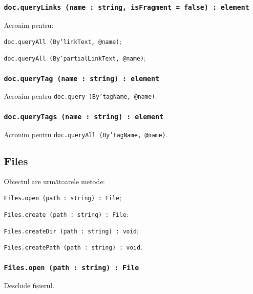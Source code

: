 \subsubsection{\texttt{doc.queryLinks (name : string, isFragment = false) : element}}

Acronim pentru:
\begin{icItems}
	\item \texttt{doc.queryAll (By'linkText, @name)};
	\item \texttt{doc.queryAll (By'partialLinkText, @name)};
\end{icItems}

\subsubsection{\texttt{doc.queryTag (name : string) : element}}

Acronim pentru \texttt{doc.query (By'tagName, @name)}.

\subsubsection{\texttt{doc.queryTags (name : string) : element}}

Acronim pentru \texttt{doc.queryAll (By'tagName, @name)}.

\subsection{{\color{orange} Files}}

Obiectul \files{} are următoarele metode:
\begin{icItems}
	\item \texttt{Files.open (path : string) : File};
	\item \texttt{Files.create (path : string) : File};
	\item \texttt{Files.createDir (path : string) : void};
	\item \texttt{Files.createPath (path : string) : void}.
\end{icItems}

\subsubsection{\texttt{Files.open (path : string) : File}}

Deschide fișierul.

